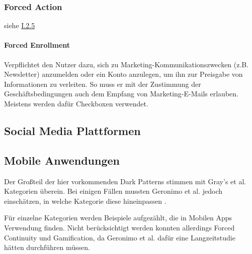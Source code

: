 \documentclass[a4paper]{article}
\newcommand{\todo}[1]{{\color{purple}{#1}}}
\begin{document}
\subsubsection{Forced Action}
\label{sssec:forced_action2}
siehe \hyperref[sssec:forced_action]{I.2.5}

\paragraph{Forced Enrollment}
\label{para:forced_enrollment}
Verpflichtet den Nutzer dazu, sich zu Marketing-Kommunikationszwecken (z.B. Newsletter) anzumelden oder ein Konto anzulegen, um ihn zur Preisgabe von Informationen zu verleiten. So muss er mit der Zustimmung der Geschäftsbedingungen auch dem Empfang von Marketing-E-Mails erlauben. Meistens werden dafür Checkboxen verwendet.

\subsection{Social Media Plattformen}
\label{sub:soziale_netzwerke}
\todo{Text hinzufügen}

\subsection{Mobile Anwendungen}
\label{sub:mobile_anwendungen}
Der Großteil der hier vorkommenden Dark Patterns stimmen mit Gray's et al. Kategorien überein. Bei einigen Fällen mussten Geronimo et al. jedoch einschätzen, in welche Kategorie diese hineinpassen \cite{geronimo}.

Für einzelne Kategorien werden Beispiele aufgezählt, die in Mobilen Apps Verwendung finden. Nicht berücksichtigt werden konnten allerdings Forced Continuity und Gamification, da Geronimo et al. dafür eine Langzeitstudie hätten durchführen müssen.\newline

\todo{Tabelle mit UI-Beispielen hinzufügen}
\end{document}
